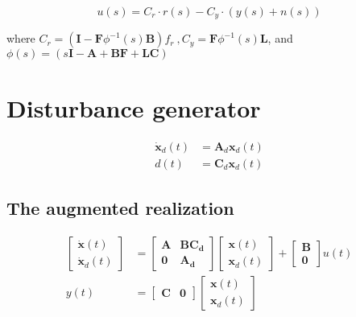 \[
u(s)=C_{r}\cdot r(s)-C_{y}\cdot(y(s)+n(s))
\]

where
\(
C_{r}=(\boldsymbol{I}-\boldsymbol{F}\phi^{-1}(s)\boldsymbol{B})f_{r}\ , C_{y}=\boldsymbol{F}\phi^{-1}(s)\boldsymbol{L}\), 
and \(\phi(s)=(s\boldsymbol{I}-\boldsymbol{A}+\boldsymbol{B}\boldsymbol{F}+\boldsymbol{L}\boldsymbol{C})\)



\section*{Disturbance generator}
\begin{align*}
\dot{\boldsymbol{x}}_{d}\left(t\right) & =\boldsymbol{A}_{d}\boldsymbol{x}_{d}\left(t\right)\\
d\left(t\right) & =\boldsymbol{C}_{d}\boldsymbol{x}_{d}\left(t\right)
\end{align*}
\subsection*{The augmented realization}
\begin{align*}
\begin{bmatrix}\dot{\boldsymbol{x}}\left(t\right)\\
\dot{\boldsymbol{x}}_{d}\left(t\right)
\end{bmatrix} & =\left[\begin{array}{c|c}
\boldsymbol{A} & \boldsymbol{B}\boldsymbol{C_{d}}\\
\hline \boldsymbol{0} & \boldsymbol{A_{d}}
\end{array}\right]\begin{bmatrix}\boldsymbol{x}\left(t\right)\\
\boldsymbol{x}_{d}\left(t\right)
\end{bmatrix}+\left[\begin{array}{c}
\boldsymbol{B}\\
\hline \boldsymbol{0}
\end{array}\right]u\left(t\right)\\
y\left(t\right) & =\left[\begin{array}{c|c}
\boldsymbol{C} & \boldsymbol{0}\end{array}\right]\begin{bmatrix}\boldsymbol{x}\left(t\right)\\
\boldsymbol{x}_{d}\left(t\right)
\end{bmatrix}
\end{align*}